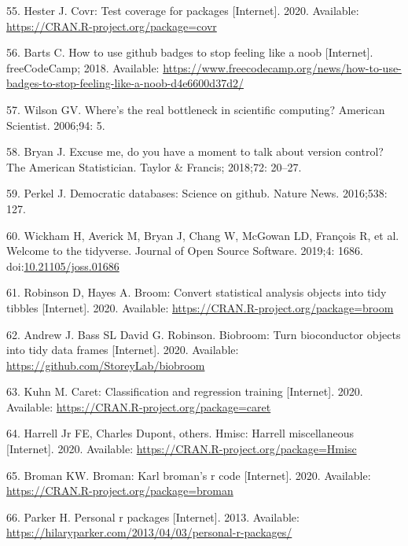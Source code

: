 \documentclass[10pt,letterpaper]{article}
\begin{document}
\leavevmode\hypertarget{ref-covr}{}%
55. Hester J. Covr: Test coverage for packages {[}Internet{]}. 2020.
Available: \url{https://CRAN.R-project.org/package=covr}

\leavevmode\hypertarget{ref-barts2018}{}%
56. Barts C. How to use github badges to stop feeling like a noob
{[}Internet{]}. freeCodeCamp; 2018. Available:
\url{https://www.freecodecamp.org/news/how-to-use-badges-to-stop-feeling-like-a-noob-d4e6600d37d2/}

\leavevmode\hypertarget{ref-wilson2006}{}%
57. Wilson GV. Where's the real bottleneck in scientific computing?
American Scientist. 2006;94: 5.

\leavevmode\hypertarget{ref-bryan2018}{}%
58. Bryan J. Excuse me, do you have a moment to talk about version
control? The American Statistician. Taylor \& Francis; 2018;72: 20--27.

\leavevmode\hypertarget{ref-perkel2016}{}%
59. Perkel J. Democratic databases: Science on github. Nature News.
2016;538: 127.

\leavevmode\hypertarget{ref-tidyverse}{}%
60. Wickham H, Averick M, Bryan J, Chang W, McGowan LD, François R, et
al. Welcome to the tidyverse. Journal of Open Source Software. 2019;4:
1686.
doi:\href{https://doi.org/10.21105/joss.01686}{10.21105/joss.01686}

\leavevmode\hypertarget{ref-broom}{}%
61. Robinson D, Hayes A. Broom: Convert statistical analysis objects
into tidy tibbles {[}Internet{]}. 2020. Available:
\url{https://CRAN.R-project.org/package=broom}

\leavevmode\hypertarget{ref-biobroom}{}%
62. Andrew J. Bass SL David G. Robinson. Biobroom: Turn bioconductor
objects into tidy data frames {[}Internet{]}. 2020. Available:
\url{https://github.com/StoreyLab/biobroom}

\leavevmode\hypertarget{ref-caret}{}%
63. Kuhn M. Caret: Classification and regression training
{[}Internet{]}. 2020. Available:
\url{https://CRAN.R-project.org/package=caret}

\leavevmode\hypertarget{ref-Hmisc}{}%
64. Harrell Jr FE, Charles Dupont, others. Hmisc: Harrell miscellaneous
{[}Internet{]}. 2020. Available:
\url{https://CRAN.R-project.org/package=Hmisc}

\leavevmode\hypertarget{ref-broman}{}%
65. Broman KW. Broman: Karl broman's r code {[}Internet{]}. 2020.
Available: \url{https://CRAN.R-project.org/package=broman}

\leavevmode\hypertarget{ref-parker2013}{}%
66. Parker H. Personal r packages {[}Internet{]}. 2013. Available:
\url{https://hilaryparker.com/2013/04/03/personal-r-packages/}
\end{document}
